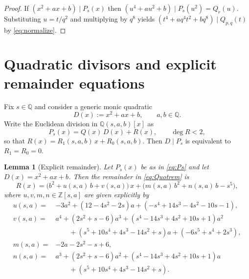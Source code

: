 \documentclass[12pt]{article}
\newtheorem{lemma}{Lemma}
\theoremstyle{remark}
\theoremstyle{definition}
\begin{document}
\begin{proof}
If $(x^{2}+ax+b)\mid P_s(x)$ then $(u^{4}+a u^{2}+b)\mid P_s(u^{2})=Q_r(u)$.
Substituting $u=t/q^{2}$ and multiplying by $q^{8}$ yields $(t^{4}+a q^{4}t^{2}+b q^{8})\mid Q_{p,q}(t)$ by \eqref{eq:normalize}.
\end{proof}


\section{Quadratic divisors and explicit remainder equations}\label{sec:remainder}

Fix $s\in\mathbb{Q}$ and consider a generic monic quadratic
\begin{equation}\label{eq:D}
D(x):=x^{2}+ax+b,\qquad a,b\in\mathbb{Q}.
\end{equation}
Write the Euclidean division in $\mathbb{Q}(s,a,b)[x]$ as
\begin{equation}\label{eq:Quotrem}
P_s(x)=Q(x)\,D(x)+R(x),\qquad \deg R<2,
\end{equation}
so that $R(x)=R_{1}(s,a,b)\,x+R_{0}(s,a,b)$.
Then $D\mid P_s$ is equivalent to $R_1=R_0=0$.

\begin{lemma}[Explicit remainder]\label{lem:Rvectors}
Let $P_s(x)$ be as in \eqref{eq:Ps} and let $D(x)=x^{2}+ax+b$.
Then the remainder in \eqref{eq:Quotrem} is
\begin{equation}\label{eq:Rform}
R(x)=\bigl(b^{2}+u(s,a)\,b+v(s,a)\bigr)\,x+\bigl(m(s,a)\,b^{2}+n(s,a)\,b-s^{5}\bigr),
\end{equation}
where $u,v,m,n\in\mathbb{Z}[s,a]$ are given explicitly by
\begin{align}
u(s,a)={}&-3a^{2}+(12-4s^{2}-2s)a+(-s^{4}+14s^{3}-4s^{2}-10s-1),\label{eq:u}\\[2pt]
v(s,a)={}&a^{4}+(2s^{2}+s-6)a^{3}+(s^{4}-14s^{3}+4s^{2}+10s+1)a^{2}\nonumber\\
&\qquad+(s^{5}+10s^{4}+4s^{3}-14s^{2}+s)a+(-6s^{5}+s^{4}+2s^{3}),\label{eq:v}\\[2pt]
m(s,a)={}&-2a-2s^{2}-s+6,\label{eq:m}\\[2pt]
n(s,a)={}&a^{3}+(2s^{2}+s-6)a^{2}+(s^{4}-14s^{3}+4s^{2}+10s+1)a\nonumber\\
&\qquad+(s^{5}+10s^{4}+4s^{3}-14s^{2}+s).\label{eq:n}
\end{align}
\end{lemma}
\end{document}
